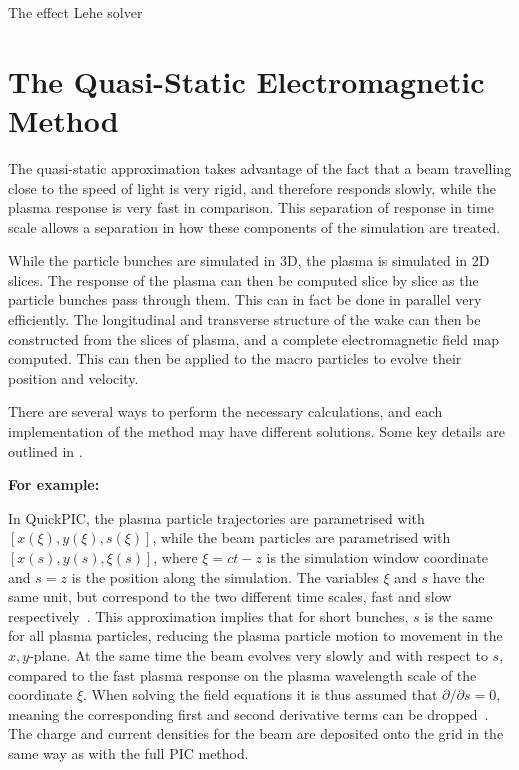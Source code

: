 The effect \cite{godfrey:1974, greenwood:2004}
Lehe solver \cite{lehe:2013}

\section{The Quasi-Static Electromagnetic Method}
\label{PIC:QS}

The quasi-static approximation takes advantage of the fact that a beam travelling close to the speed of light is very rigid, and therefore responds slowly, while the plasma response is very fast in comparison.
This separation of response in time scale allows a separation in how these components of the simulation are treated.

While the particle bunches are simulated in 3D, the plasma is simulated in 2D slices.
The response of the plasma can then be computed slice by slice as the particle bunches pass through them.
This can in fact be done in parallel very efficiently.
The longitudinal and transverse structure of the wake can then be constructed from the slices of plasma, and a complete electromagnetic field map computed.
This can then be applied to the macro particles to evolve their position and velocity.

There are several ways to perform the necessary calculations, and each implementation of the method may have different solutions.
Some key details are outlined in \cite{vay:2016}.

\bigskip
\noindent\textbf{For example:}
\bigskip

In QuickPIC, the plasma particle trajectories are parametrised with $[x(\xi), y(\xi), s(\xi)]$, while the beam particles are parametrised with $[x(s),y(s),\xi(s)]$, where $\xi = ct - z$ is the simulation window coordinate and $s=z$ is the position along the simulation.
The variables $\xi$ and $s$ have the same unit, but correspond to the two different time scales, fast and slow respectively~\cite{huang:2006}.
This approximation implies that for short bunches, $s$ is the same for all plasma particles, reducing the plasma particle motion to movement in the $x,y$-plane.
At the same time the beam evolves very slowly and with respect to $s$, compared to the fast plasma response on the plasma wavelength scale of the coordinate $\xi$.
When solving the field equations it is thus assumed that $\partial/\partial s = 0$, meaning the corresponding first and second derivative terms can be dropped~\cite{an:2013}.
The charge and current densities for the beam are deposited onto the grid in the same way as with the full PIC method.

